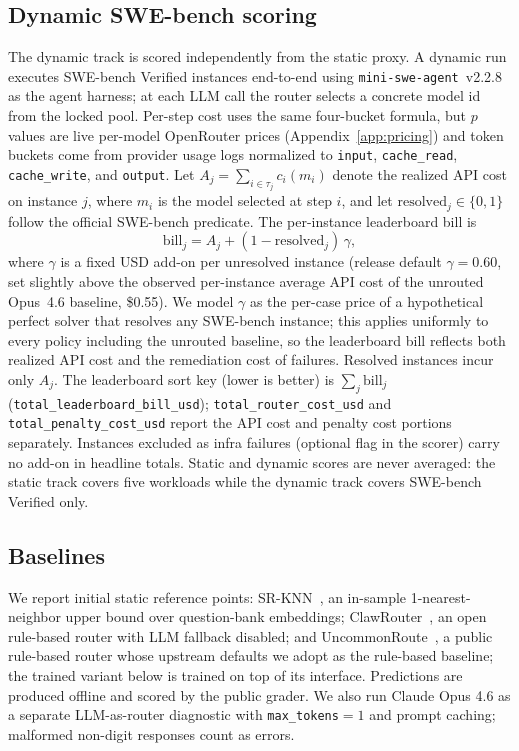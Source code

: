 \subsection{Dynamic SWE-bench scoring}
\label{sec:dynamic-scoring}

The dynamic track is scored independently from the static proxy. A dynamic run
executes SWE-bench Verified instances end-to-end using
\texttt{mini-swe-agent}~v2.2.8 as the agent harness; at each LLM call the
router selects a concrete model id from the locked pool. Per-step cost uses the same
four-bucket formula, but $p$ values are live per-model OpenRouter prices
(Appendix~\ref{app:pricing}) and token buckets come from provider usage logs
normalized to \texttt{input}, \texttt{cache\_read}, \texttt{cache\_write}, and
\texttt{output}. Let $A_j=\sum_{i\in\tau_j} c_i(m_i)$ denote the realized API
cost on instance $j$, where $m_i$ is the model selected at step $i$, and let
$\mathrm{resolved}_j\in\{0,1\}$ follow the official SWE-bench predicate. The
per-instance leaderboard bill is
\[
\mathrm{bill}_j = A_j + (1-\mathrm{resolved}_j)\,\gamma,
\]
where $\gamma$ is a fixed USD add-on per unresolved instance (release default
$\gamma{=}0.60$, set slightly above the observed per-instance average API
cost of the unrouted Opus~4.6 baseline, \$0.55). We model $\gamma$ as the
per-case price of a hypothetical perfect solver that resolves any SWE-bench
instance; this applies uniformly to
every policy including the unrouted baseline, so the leaderboard bill reflects
both realized API cost and the remediation cost of failures. Resolved
instances incur only $A_j$. The leaderboard sort key (lower is better) is $\sum_j \mathrm{bill}_j$
(\texttt{total\_leaderboard\_bill\_usd}); \texttt{total\_router\_cost\_usd}
and \texttt{total\_penalty\_cost\_usd} report the API cost and penalty cost
portions separately. Instances excluded as infra failures (optional flag in the scorer)
carry no add-on in headline totals. Static and dynamic scores are never
averaged: the static track covers five workloads while the dynamic track covers
SWE-bench Verified only.

\subsection{Baselines}
\label{sec:baselines}

We report initial static reference points: SR-KNN~\citep{liu2026vllmsemanticrouter}, an in-sample
1-nearest-neighbor upper bound over question-bank embeddings; ClawRouter~\citep{clawrouter}, an
open rule-based router with LLM fallback disabled; and
UncommonRoute~\citep{uncommonroute}, a public rule-based router whose
upstream defaults we adopt as the rule-based baseline; the trained variant
below is trained on top of its interface. Predictions are produced offline
and scored by the public grader. We also run Claude Opus 4.6 as a separate
LLM-as-router diagnostic with \texttt{max\_tokens}$=1$ and prompt caching;
malformed non-digit responses count as errors.

